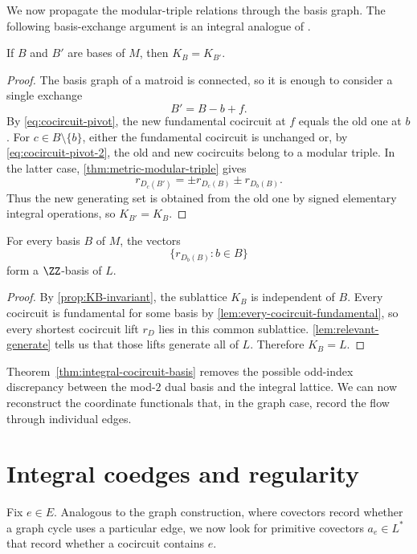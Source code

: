 \documentclass[11pt,letterpaper]{amsart}
\begin{document}
We now propagate the modular-triple relations through the basis graph. The following basis-exchange argument is an integral analogue of \cite[Lemma 3.21]{pendavingh2013skew}. 

\begin{proposition}\label{prop:KB-invariant}
If $B$ and $B'$ are bases of $M$, then $K_B=K_{B'}$.
\end{proposition}

\begin{proof}
The basis graph of a matroid is connected, so it is enough to consider a single exchange
\[
  B'=B-b+f.
\]
By \eqref{eq:cocircuit-pivot}, the new fundamental cocircuit at $f$ equals the old one at $b$.  For $c\in B\setminus\{b\}$, either the fundamental cocircuit is unchanged or, by \eqref{eq:cocircuit-pivot-2}, the old and new cocircuits belong to a modular triple.  In the latter case, \cref{thm:metric-modular-triple} gives
\[
  r_{D_c(B')}=\pm r_{D_c(B)}\pm r_{D_b(B)}.
\]
Thus the new generating set is obtained from the old one by signed elementary integral operations, so $K_{B'}=K_B$.
\end{proof}

\begin{theorem}\label{thm:integral-cocircuit-basis}
For every basis $B$ of $M$, the vectors
\[
  \{r_{D_b(B)}:b\in B\}
\]
form a $\ZZ$-basis of $L$.
\end{theorem}

\begin{proof}
By \cref{prop:KB-invariant}, the sublattice $K_B$ is independent of $B$.  Every cocircuit is fundamental for some basis by \cref{lem:every-cocircuit-fundamental}, so every shortest cocircuit lift $r_D$ lies in this common sublattice.  \cref{lem:relevant-generate} tells us that those lifts generate all of $L$.  Therefore $K_B=L$.
\end{proof}

Theorem~\ref{thm:integral-cocircuit-basis} removes the possible odd-index discrepancy between the mod-$2$ dual basis and the integral lattice. We can now reconstruct the coordinate functionals that, in the graph case, record the flow through individual edges.

\section{Integral coedges and regularity}\label{sec:regularity}

Fix $e\in E$.  Analogous to the graph construction, where covectors record whether a graph cycle uses a particular edge, we now look for primitive covectors $a_e\in L^*$ that record whether a cocircuit contains $e$.
\end{document}
